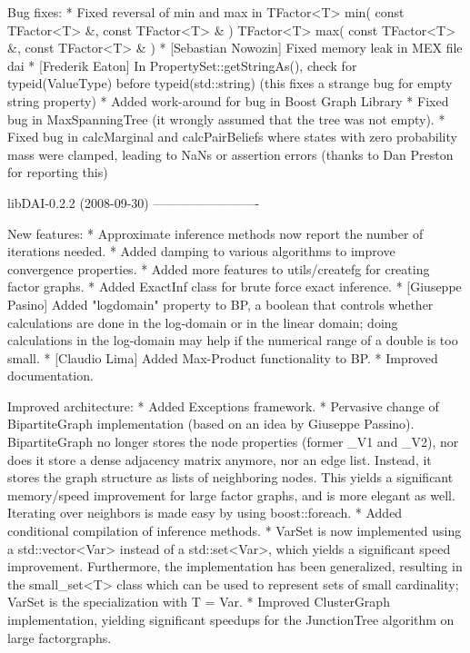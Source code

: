 \begin{DoxyVerbInclude}
Bug fixes:
* Fixed reversal of min and max in 
  TFactor<T> min( const TFactor<T> &, const TFactor<T> & )
  TFactor<T> max( const TFactor<T> &, const TFactor<T> & )
* [Sebastian Nowozin] Fixed memory leak in MEX file dai
* [Frederik Eaton] In PropertySet::getStringAs(), check for typeid(ValueType) 
  before typeid(std::string) (this fixes a strange bug for empty string property)
* Added work-around for bug in Boost Graph Library
* Fixed bug in MaxSpanningTree (it wrongly assumed that the tree was not empty).
* Fixed bug in calcMarginal and calcPairBeliefs where states with zero probability 
  mass were clamped, leading to NaNs or assertion errors (thanks to Dan Preston 
  for reporting this)


libDAI-0.2.2 (2008-09-30)
-------------------------

New features:
* Approximate inference methods now report the number of iterations needed.
* Added damping to various algorithms to improve convergence properties.
* Added more features to utils/createfg for creating factor graphs.
* Added ExactInf class for brute force exact inference.
* [Giuseppe Pasino] Added "logdomain" property to BP, a boolean that controls
  whether calculations are done in the log-domain or in the linear domain;
  doing calculations in the log-domain may help if the numerical range
  of a double is too small.
* [Claudio Lima] Added Max-Product functionality to BP.
* Improved documentation.

Improved architecture:
* Added Exceptions framework.
* Pervasive change of BipartiteGraph implementation (based on an idea by
  Giuseppe Passino). BipartiteGraph no longer stores the node properties
  (former _V1 and _V2), nor does it store a dense adjacency matrix anymore,
  nor an edge list. Instead, it stores the graph structure as lists of
  neighboring nodes. This yields a significant memory/speed improvement for
  large factor graphs, and is more elegant as well. Iterating over neighbors is
  made easy by using boost::foreach.
* Added conditional compilation of inference methods.
* VarSet is now implemented using a std::vector<Var> instead of a
  std::set<Var>, which yields a significant speed improvement. Furthermore,
  the implementation has been generalized, resulting in the small_set<T> class
  which can be used to represent sets of small cardinality; VarSet is the
  specialization with T = Var.
* Improved ClusterGraph implementation, yielding significant speedups
  for the JunctionTree algorithm on large factorgraphs.


\end{DoxyVerbInclude}
